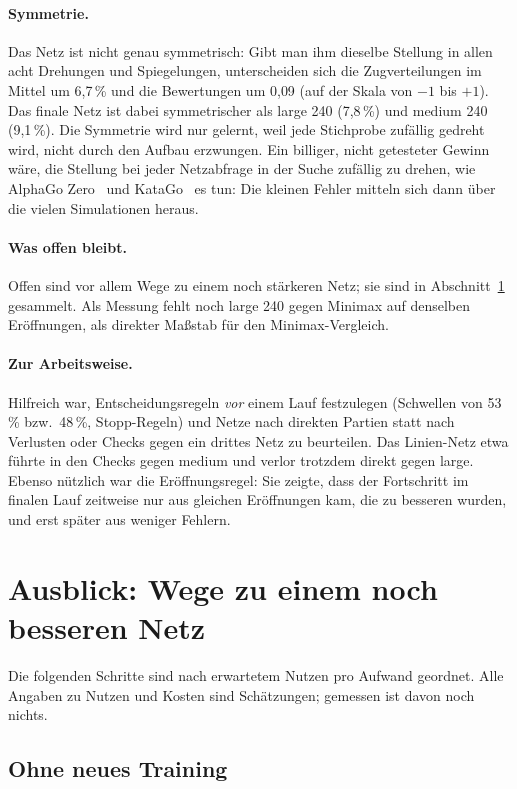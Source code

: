 \documentclass[11pt,a4paper]{article}
\begin{document}
\paragraph{Symmetrie.} Das Netz ist nicht genau symmetrisch: Gibt man ihm dieselbe Stellung in allen acht
Drehungen und Spiegelungen, unterscheiden sich die Zugverteilungen im Mittel um 6{,}7\,\% und die
Bewertungen um 0{,}09 (auf der Skala von $-1$ bis $+1$). Das finale Netz ist dabei symmetrischer als large
240 (7{,}8\,\%) und medium 240 (9{,}1\,\%). Die Symmetrie wird nur gelernt, weil jede Stichprobe zufällig
gedreht wird, nicht durch den Aufbau erzwungen. Ein billiger, nicht getesteter Gewinn wäre, die Stellung
bei jeder Netzabfrage in der Suche zufällig zu drehen, wie AlphaGo Zero~\cite{alphagozero} und
KataGo~\cite{katago} es tun: Die kleinen Fehler mitteln sich dann über die vielen Simulationen heraus.

\paragraph{Was offen bleibt.} Offen sind vor allem Wege zu einem noch stärkeren Netz; sie sind in
Abschnitt~\ref{sec:ausblick} gesammelt. Als Messung fehlt noch large 240 gegen Minimax auf denselben
Eröffnungen, als direkter Maßstab für den Minimax-Vergleich.

\paragraph{Zur Arbeitsweise.} Hilfreich war, Entscheidungsregeln \emph{vor} einem Lauf festzulegen
(Schwellen von 53\,\% bzw.\ 48\,\%, Stopp-Regeln) und Netze nach direkten Partien statt nach Verlusten oder
Checks gegen ein drittes Netz zu beurteilen. Das Linien-Netz etwa führte in den Checks gegen medium und
verlor trotzdem direkt gegen large. Ebenso nützlich war die Eröffnungsregel: Sie zeigte, dass der
Fortschritt im finalen Lauf zeitweise nur aus gleichen Eröffnungen kam, die zu besseren wurden, und erst
später aus weniger Fehlern.

\section{Ausblick: Wege zu einem noch besseren Netz}
\label{sec:ausblick}

Die folgenden Schritte sind nach erwartetem Nutzen pro Aufwand geordnet. Alle Angaben zu Nutzen und
Kosten sind Schätzungen; gemessen ist davon noch nichts.

\subsection{Ohne neues Training}
\end{document}
